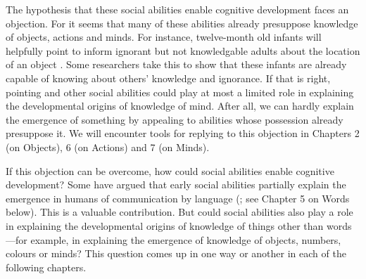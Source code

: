 \documentclass[12pt,\papersize]{extarticle}
\begin{document}
The hypothesis that these social abilities enable cognitive development faces an objection. 
For it seems that many of these abilities already presuppose  knowledge of objects, actions and minds. 
For instance, twelve-month old infants  will helpfully point to inform ignorant but not knowledgable adults about the location of an object  \citep{Liszkowski:2008al}.
Some researchers take this to show that these infants are already capable of knowing about others' knowledge and ignorance. 
If that is right, pointing and other social abilities could play at most a limited role in explaining the developmental origins of knowledge of mind. 
After all, we can hardly explain the emergence of something by appealing to abilities whose possession already presuppose it.
We will encounter tools for replying to this objection in Chapters 2 (on Objects), 6 (on Actions) and 7 (on Minds).

If this objection can be overcome, how could social abilities enable cognitive development? 
Some have argued that early social abilities partially explain the emergence in humans of communication by language (\citealp{tomasello:2008origins}; see Chapter 5 on Words below). 
This is a valuable contribution.  
But could social abilities also play a role in explaining the developmental origins of knowledge of things other than words---for example, in explaining the emergence of knowledge of objects, numbers, colours or minds? 
This question comes up in one way or another in each of the following chapters.
\end{document}
